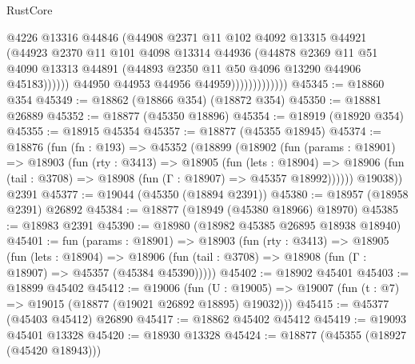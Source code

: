 \begin{lexlean}{RustCore}
\begin{coremodule}
                                  @4226
                                  @13316
                                  @44846
                                  (@44908
                                    @2371
                                    @11
                                    @102
                                    @4092
                                    @13315
                                    @44921
                                    (@44923
                                      @2370
                                      @11
                                      @101
                                      @4098
                                      @13314
                                      @44936
                                      (@44878
                                        @2369
                                        @11
                                        @51
                                        @4090
                                        @13313
                                        @44891
                                        (@44893 @2350 @11 @50 @4096 @13290 @44906 @45183))))))
                              @44950
                              @44953
                              @44956
                              @44959)))))))))))))
@45345 := @18860 @354
@45349 := @18862 (@18866 @354) (@18872 @354)
@45350 := @18881 @26889
@45352 := @18877 (@45350 @18896)
@45354 := @18919 (@18920 @354)
@45355 := @18915 @45354
@45357 := @18877 (@45355 @18945)
@45374 := @18876
    (fun (fn : @193) =>
    @45352
      (@18899
        (@18902
          (fun (params : @18901) =>
          @18903
            (fun (rty : @3413) =>
            @18905
              (fun (lets : @18904) =>
              @18906 (fun (tail : @3708) => @18908 (fun (Γ : @18907) => @45357 @18992))))))
        @19038))
    @2391
@45377 := @19044 (@45350 (@18894 @2391))
@45380 := @18957 (@18958 @2391) @26892
@45384 := @18877 (@18949 (@45380 @18966) @18970)
@45385 := @18983 @2391
@45390 := @18980 (@18982 @45385 @26895 @18938 @18940)
@45401 := fun (params : @18901) =>
  @18903
    (fun (rty : @3413) =>
    @18905
      (fun (lets : @18904) =>
      @18906 (fun (tail : @3708) => @18908 (fun (Γ : @18907) => @45357 (@45384 @45390)))))
@45402 := @18902 @45401
@45403 := @18899 @45402
@45412 := @19006
    (fun (U : @19005) => @19007 (fun (t : @7) => @19015 (@18877 (@19021 @26892 @18895) @19032)))
@45415 := @45377 (@45403 @45412) @26890
@45417 := @18862 @45402 @45412
@45419 := @19093 @45401 @13328
@45420 := @18930 @13328
@45424 := @18877 (@45355 (@18927 (@45420 @18943)))

\end{coremodule}
\end{lexlean}
